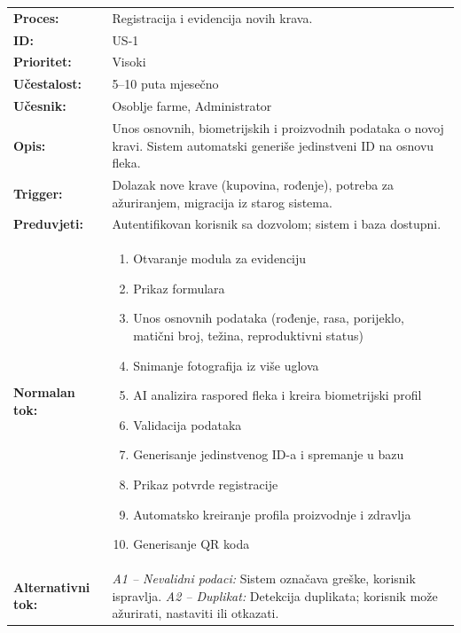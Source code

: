 \documentclass{article}
\begin{document}
\begin{table}[H]
\centering
\small
\begin{tabular}{|p{3.5cm}|p{11cm}|}
\hline
\rowcolor[HTML]{B4C7E7}
\multicolumn{2}{|c|}{\textbf{US-1: Evidencija krava}} \\
\hline
\textbf{Proces:} & Registracija i evidencija novih krava. \\
\hline
\textbf{ID:} & US-1 \\
\hline
\textbf{Prioritet:} & Visoki \\
\hline
\textbf{Učestalost:} & 5–10 puta mjesečno \\
\hline
\textbf{Učesnik:} & Osoblje farme, Administrator \\
\hline
\textbf{Opis:} & Unos osnovnih, biometrijskih i proizvodnih podataka o novoj kravi. Sistem automatski generiše jedinstveni ID na osnovu fleka. \\
\hline
\textbf{Trigger:} & Dolazak nove krave (kupovina, rođenje), potreba za ažuriranjem, migracija iz starog sistema. \\
\hline
\textbf{Preduvjeti:} & Autentifikovan korisnik sa dozvolom; sistem i baza dostupni. \\
\hline
\textbf{Normalan tok:} &
\begin{enumerate}[leftmargin=*, nosep]
    \item Otvaranje modula za evidenciju
    \item Prikaz formulara
    \item Unos osnovnih podataka (rođenje, rasa, porijeklo, matični broj, težina, reproduktivni status)
    \item Snimanje fotografija iz više uglova
    \item AI analizira raspored fleka i kreira biometrijski profil
    \item Validacija podataka
    \item Generisanje jedinstvenog ID-a i spremanje u bazu
    \item Prikaz potvrde registracije
    \item Automatsko kreiranje profila proizvodnje i zdravlja
    \item Generisanje QR koda
\end{enumerate} \\
\hline
\textbf{Alternativni tok:} &
\textit{A1 – Nevalidni podaci:} Sistem označava greške, korisnik ispravlja. \newline
\textit{A2 – Duplikat:} Detekcija duplikata; korisnik može ažurirati, nastaviti ili otkazati. \newline

\end{tabular}
\end{table}
\end{document}
